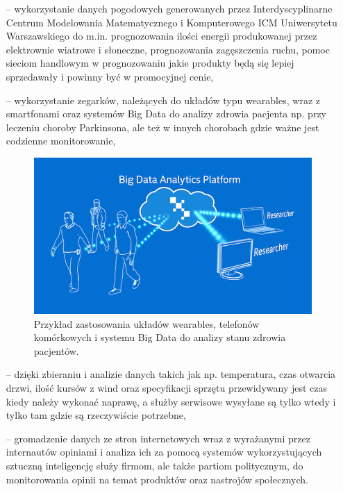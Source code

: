 \begin{itemize}
	\item[--] wykorzystanie danych pogodowych generowanych przez Interdyscyplinarne Centrum Modelowania Matematycznego i Komputerowego ICM Uniwersytetu Warszawskiego do m.in. prognozowania ilości energii produkowanej przez elektrownie wiatrowe i słoneczne, prognozowania zagęszczenia ruchu, pomoc sieciom handlowym w prognozowaniu jakie produkty będą się lepiej sprzedawały i powinny być w promocyjnej cenie, 
	\item[--] wykorzystanie zegarków, należących do układów typu wearables, wraz z smartfonami oraz systemów Big Data do analizy zdrowia pacjenta np. przy leczeniu choroby Parkinsona, ale też w innych chorobach gdzie ważne jest codzienne monitorowanie,

\begin{figure}[h] %
	\centering
	\includegraphics[width=1.0\linewidth]{img/big_data_intel_parkinson}
	\caption{Przykład zastosowania układów wearables, telefonów komórkowych i systemu Big Data do analizy stanu zdrowia pacjentów.}
\end{figure}

	\item[--] dzięki zbieraniu i analizie danych takich jak np. temperatura, czas otwarcia drzwi, ilość kursów z wind oraz specyfikacji sprzętu przewidywany jest czas kiedy należy wykonać naprawę, a służby serwisowe wysyłane są tylko wtedy i tylko tam gdzie są rzeczywiście potrzebne,
	\item[--] gromadzenie danych ze stron internetowych wraz z wyrażanymi przez internautów opiniami i analiza ich za pomocą systemów wykorzystujących sztuczną inteligencję służy firmom, ale także partiom politycznym, do monitorowania opinii na temat produktów oraz nastrojów społecznych.
	
\end{itemize}

